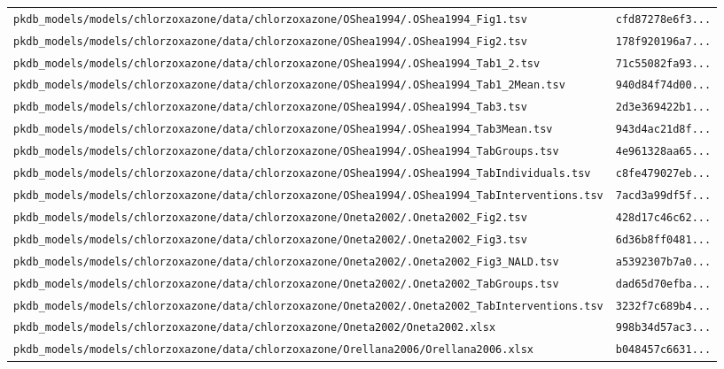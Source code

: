 \begin{longtable}{ll}
\texttt{pkdb\_models/models/chlorzoxazone/data/chlorzoxazone/OShea1994/.OShea1994\_Fig1.tsv} & \texttt{cfd87278e6f3...} \\
\texttt{pkdb\_models/models/chlorzoxazone/data/chlorzoxazone/OShea1994/.OShea1994\_Fig2.tsv} & \texttt{178f920196a7...} \\
\texttt{pkdb\_models/models/chlorzoxazone/data/chlorzoxazone/OShea1994/.OShea1994\_Tab1\_2.tsv} & \texttt{71c55082fa93...} \\
\texttt{pkdb\_models/models/chlorzoxazone/data/chlorzoxazone/OShea1994/.OShea1994\_Tab1\_2Mean.tsv} & \texttt{940d84f74d00...} \\
\texttt{pkdb\_models/models/chlorzoxazone/data/chlorzoxazone/OShea1994/.OShea1994\_Tab3.tsv} & \texttt{2d3e369422b1...} \\
\texttt{pkdb\_models/models/chlorzoxazone/data/chlorzoxazone/OShea1994/.OShea1994\_Tab3Mean.tsv} & \texttt{943d4ac21d8f...} \\
\texttt{pkdb\_models/models/chlorzoxazone/data/chlorzoxazone/OShea1994/.OShea1994\_TabGroups.tsv} & \texttt{4e961328aa65...} \\
\texttt{pkdb\_models/models/chlorzoxazone/data/chlorzoxazone/OShea1994/.OShea1994\_TabIndividuals.tsv} & \texttt{c8fe479027eb...} \\
\texttt{pkdb\_models/models/chlorzoxazone/data/chlorzoxazone/OShea1994/.OShea1994\_TabInterventions.tsv} & \texttt{7acd3a99df5f...} \\
\texttt{pkdb\_models/models/chlorzoxazone/data/chlorzoxazone/Oneta2002/.Oneta2002\_Fig2.tsv} & \texttt{428d17c46c62...} \\
\texttt{pkdb\_models/models/chlorzoxazone/data/chlorzoxazone/Oneta2002/.Oneta2002\_Fig3.tsv} & \texttt{6d36b8ff0481...} \\
\texttt{pkdb\_models/models/chlorzoxazone/data/chlorzoxazone/Oneta2002/.Oneta2002\_Fig3\_NALD.tsv} & \texttt{a5392307b7a0...} \\
\texttt{pkdb\_models/models/chlorzoxazone/data/chlorzoxazone/Oneta2002/.Oneta2002\_TabGroups.tsv} & \texttt{dad65d70efba...} \\
\texttt{pkdb\_models/models/chlorzoxazone/data/chlorzoxazone/Oneta2002/.Oneta2002\_TabInterventions.tsv} & \texttt{3232f7c689b4...} \\
\texttt{pkdb\_models/models/chlorzoxazone/data/chlorzoxazone/Oneta2002/Oneta2002.xlsx} & \texttt{998b34d57ac3...} \\
\texttt{pkdb\_models/models/chlorzoxazone/data/chlorzoxazone/Orellana2006/Orellana2006.xlsx} & \texttt{b048457c6631...} \\

\end{longtable}
